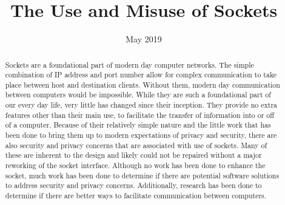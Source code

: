 \documentclass[conference, 12pt]{IEEEtran}
\begin{document}
\title{The Use and Misuse of Sockets}

\author{
\and
{}
\and
{}
}

\date{May 2019}

\maketitle

\begin{abstract}
Sockets are a foundational part of modern day computer networks. The simple combination of IP address and port number allow for complex communication to take place between host and destination clients. Without them, modern day communication between computers would be impossible. While they are such a foundational part of our every day life, very little has changed since their inception. They provide no extra features other than their main use, to facilitate the transfer of information into or off of a computer. Because of their relatively simple nature and the little work that has been done to bring them up to modern expectations of privacy and security, there are also  security and privacy concerns that are associated with use of sockets. Many of these are inherent to the design and likely could not be repaired without a major reworking of the socket interface. Although no work has been done to enhance the socket, much work has been done to determine if there are potential software solutions to address security and privacy concerns. Additionally, research has been done to determine if there are better ways to facilitate communication between computers.
\end{abstract}
\end{document}
